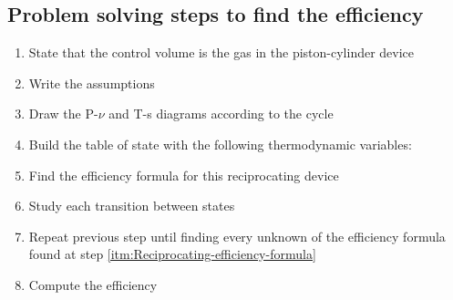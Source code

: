 \documentclass[10pt, twocolumn]{article}
\begin{document}
\subsection{Problem solving steps to find the efficiency}
\begin{enumerate}
  \item State that the control volume is the gas in the piston-cylinder device
  \item Write the assumptions
  \item Draw the P-\(\nu\) and T-s diagrams according to the cycle
  \item Build the table of state with the following thermodynamic variables:
  \item \label{itm:Reciprocating-efficiency-formula} Find the efficiency formula for this reciprocating device
  \item Study each transition between states
  \item Repeat previous step until finding every unknown of the efficiency formula found at step \ref{itm:Reciprocating-efficiency-formula}
  \item Compute the efficiency
\end{enumerate}
\end{document}
